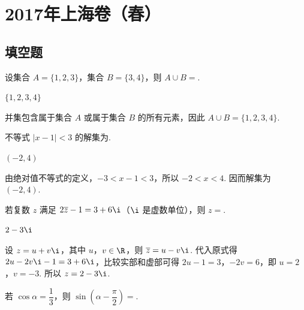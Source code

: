 \chapter{2017年上海卷（春）}

\section{填空题}

\begin{problem}
设集合 \(A=\{1,2,3\}\)，集合 \(B=\{3,4\}\)，则 \(A\cup B=\)\fillinblank{}.
\end{problem}

\begin{answer}
\(\{1,2,3,4\}\)
\end{answer}

\begin{solution}
并集包含属于集合 \(A\) 或属于集合 \(B\) 的所有元素，因此 \(A\cup B=\{1,2,3,4\}\).
\end{solution}

\begin{problem}
不等式 \(\lvert x-1\rvert<3\) 的解集为\fillinblank{}.
\end{problem}

\begin{answer}
\((-2,4)\)
\end{answer}

\begin{solution}
由绝对值不等式的定义，\(-3<x-1<3\)，所以 \(-2<x<4\). 因而解集为 \((-2,4)\).
\end{solution}

\begin{problem}
若复数 \(z\) 满足 \(2\overline{z}-1=3+6\i\)（\(\i\) 是虚数单位），则 \(z=\)\fillinblank{}.
\end{problem}

\begin{answer}
\(2-3\i\)
\end{answer}

\begin{solution}
设 \(z=u+v\i\)，其中 \(u\)，\(v\in\R\)，则 \(\overline z=u-v\i\). 代入原式得 \(2u-2v\i-1=3+6\i\)，比较实部和虚部可得 \(2u-1=3\)，\(-2v=6\)，即 \(u=2\)，\(v=-3\). 所以 \(z=2-3\i\).
\end{solution}

\begin{problem}
若 \(\cos\alpha=\dfrac13\)，则 \(\sin\left(\alpha-\dfrac{\pi}{2}\right)=\)\fillinblank{}.
\end{problem}

